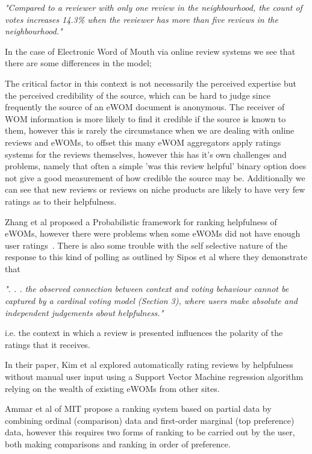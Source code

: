 \emph{"Compared to a reviewer with only one review in the neighbourhood, the count of votes increases 14.3\% when the reviewer has more than five reviews in the neighbourhood."}

In the case of Electronic Word of Mouth via online review systems we see that there are some differences in the model;

The critical factor in this context is not necessarily the perceived expertise but the perceived credibility of the source, which can be hard to judge since frequently the source of an eWOM document is anonymous. The receiver of WOM information is more likely to find it credible if the source is known to them\cite{Bart}, however this is rarely the circumstance when we are dealing with online reviews and eWOMs, to offset this many eWOM aggregators apply ratings systems for the reviews themselves\cite{Krestel}, however this has it's own challenges and problems, namely that often a simple 'was this review helpful' binary option does not give a good measurement of how credible the source may be. Additionally we can see that new reviews or reviews on niche products are likely to have very few ratings as to their helpfulness\cite{Ghose}. 

Zhang et al proposed a Probabilistic framework for ranking helpfulness of eWOMs, however there were problems when some eWOMs did not have enough user ratings~\cite{Zhang}. There is also some trouble with the self selective nature of the response to this kind of polling as outlined by Sipos et al\cite{Sipos} where they demonstrate that 

\emph{". . . the observed connection between context and voting  behaviour  cannot  be  captured  by  a  cardinal  voting model (Section 3), where users make absolute and independent judgements about helpfulness."}

i.e. the context in which a review is presented influences the polarity of the ratings that it receives.

In their paper, Kim et al\cite{Kim} explored automatically rating reviews by helpfulness without manual user input using a Support Vector Machine regression algorithm relying on the wealth of existing eWOMs from other sites. 

Ammar et al\cite{Ammar} of MIT propose a ranking system based on partial data by combining ordinal (comparison) data and first-order marginal (top preference) data, however this requires two forms of ranking to be carried out by the user, both making comparisons and ranking in order of preference.

